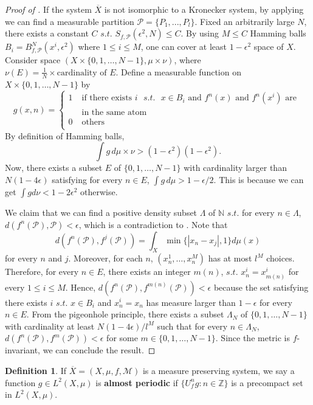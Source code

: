 \documentclass[oneside]{amsart}
\theoremstyle{plain}
\theoremstyle{definition}
\newtheorem{DEF}[THM]{Definition}
\newcommand{\<}{\langle}
\renewcommand{\>}{\rangle}
\renewcommand{\P}{\mathcal{P}}
\newcommand{\e}{\epsilon}
\renewcommand{\bar}{\overline}
\renewcommand{\|}{|\!|} %
\begin{document}
\begin{proof}[Proof of ]
If the system $\bar{X}$ is not isomorphic to a Kronecker system, by 
applying  we can find a measurable partition $\P=\{P_1,...,P_l\}$. Fixed an arbitrarily large $N$, there exists a constant $C$ $s.t.$ 
$S_{f,\P}(\e^2,N)\leq C$. By using  $M\leq C$ Hamming balls     $B_i=B_{f,\P}^N(x^i,\e^2)$ where $1\leq i\leq M$, one can cover at least $1-\e^2$ space of $X$. Consider space $(X\times \{0,1,\dots,N-1\}, \mu \times \nu )$, where $\nu(E)= \frac{1}{N} \times \text{cardinality of } E$. Define a measurable function on $X\times \{0,1,\dots,N-1\}$ by
$$ g(x,n)=\left\{
\begin{aligned}
1 & \; \text{if there exists $i$ $s.t.$  $x \in B_i$ and  $f^n(x)$ and $f^n(x^i)$ are }\\
  &\; \text{in the same atom}\\
0 &\; \text{others} \\
\end{aligned}
\right.
$$
By definition of Hamming balls, \[\int g \, d\mu \times \nu > (1-\epsilon^2)(1-\epsilon^2).\]
Now, there exists a subset $E$ of $\{0,1,\dots,N-1\}$ with cardinality larger than $N(1-4\epsilon)$ 
satisfying for every $n \in E$, $\int g \, d\mu>1-\epsilon/2$. 
This is because we can get  $\int g d\nu < 1-2\e^2$ otherwise.

We claim that we can find a positive density subset $\Lambda$ of $\mathbb{N}$ $s.t.$ for every $n\in \Lambda$, $d(f^{n}(\P),\P)<\e$, which is a contradiction to .
Note that \[d(f^{n}(\P),f^{j}(\P))=\int_{X} \min\{|x_n-x_j|,1 \}d\mu(x)\] for every $n$ and $j$. Moreover, for each 
$n$, $ (x_n^1,\dots,x_n^M )$ has at most $l^M$  choices. Therefore, for every $n\in E$, there exists an integer
$m(n)$, $s.t.$ $x_n^i=x_{m(n)}^i$ for every $1\leq i\leq M$. Hence, $d(f^n(\P),f^{m(n)}(\P))<\e$
because the set satisfying there exists $i$ $s.t.$ $x\in B_i$ and $x_n^i=x_n$ has measure larger
than $1-\e$ for every $n\in E$. From the pigeonhole principle, there exists a subset $\Lambda_N$ of 
$\{0,1,\dots,N-1\}$ with cardinality at least $N(1-4\e)/l^M$ such that for every $n\in \Lambda_N$, 
$d(f^n(\P),f^{m}(\P))<\e$ for some $m\in \{0,1,\dots,N-1\}$. Since the metric is $f$-invariant, we can conclude the result.
\end{proof}


\begin{DEF}
If $\bar{X}=(X,\mu,f,\mathcal{M})$ is a measure preserving system, we say a function $g \in L^2(X,\mu)$ is {\bf almost periodic} if $\{U_{f}^n g : n\in \mathbb{Z}\}$ is a precompact set in $L^2(X,\mu)$.
\end{DEF}
\end{document}
